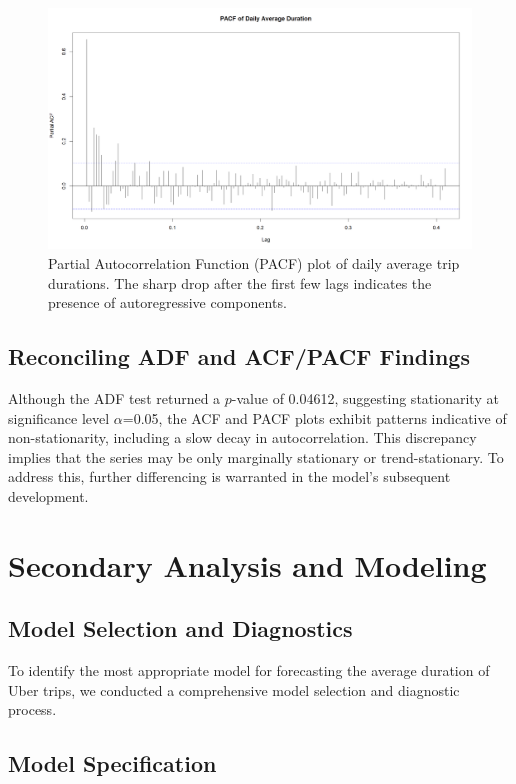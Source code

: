 \documentclass{article}
\begin{document}
\begin{figure}
  \includegraphics[width=\textwidth]{finalproject/images/pacf-plot.png}
  \caption{Partial Autocorrelation Function (PACF) plot of daily average trip durations. The sharp drop after the first few lags indicates the presence of autoregressive components.}
  \label{fig:pacf_plot}
\end{figure}

\subsection{Reconciling ADF and ACF/PACF Findings}
Although the ADF test returned a $p$-value of 0.04612, suggesting stationarity at significance level $\alpha$=0.05, the ACF and PACF plots exhibit patterns indicative of non-stationarity, including a slow decay in autocorrelation. This discrepancy implies that the series may be only marginally stationary or trend-stationary. To address this, further differencing is warranted in the model's subsequent development.


\section{Secondary Analysis and Modeling}


\subsection{Model Selection and Diagnostics}

To identify the most appropriate model for forecasting the average duration of Uber trips, we conducted a comprehensive model selection and diagnostic process.

\subsection{Model Specification}
\end{document}
